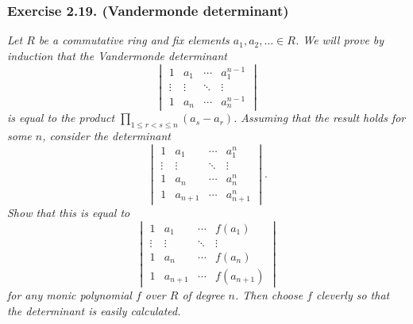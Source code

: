 \documentclass{article}
\begin{document}
\subsubsection*{Exercise 2.19. (Vandermonde determinant)}
\emph{Let $R$ be a commutative ring and fix elements $a_1, a_2, \ldots \in R$.
We will prove by induction that the Vandermonde determinant
\[
  \begin{vmatrix}
    1 & a_1 & \cdots & a_1^{n-1} \\
    \vdots & \vdots & \ddots & \vdots \\
    1 & a_n & \cdots & a_n^{n-1}
  \end{vmatrix}
\]
is equal to the product $\prod_{1 \leq r < s \leq n}(a_s - a_r)$.
Assuming that the result holds for some $n$, consider the determinant
\[
  \begin{vmatrix}
    1 & a_1 & \cdots & a_1^{n} \\
    \vdots & \vdots & \ddots & \vdots \\
    1 & a_n & \cdots & a_n^{n} \\
    1 & a_{n+1} & \cdots & a_{n+1}^{n}
  \end{vmatrix}.
\]
Show that this is equal to
\[
  \begin{vmatrix}
    1 & a_1 & \cdots & f(a_1) \\
    \vdots & \vdots & \ddots & \vdots \\
    1 & a_n & \cdots & f(a_n) \\
    1 & a_{n+1} & \cdots & f(a_{n+1})
  \end{vmatrix}
\]
for any monic polynomial $f$ over $R$ of degree $n$.
Then choose $f$ cleverly so that the determinant is easily calculated.} \\
\end{document}
